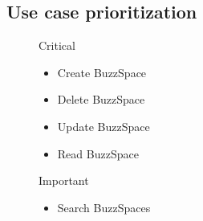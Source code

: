 \documentclass{article}
\begin{document}
	\subsection{Use case prioritization}
	\begin{description}
		\item[] Critical
		\begin{itemize}
			\item Create BuzzSpace
			\item Delete BuzzSpace
			\item Update BuzzSpace
			\item Read BuzzSpace
		\end{itemize}
		
		\item[] Important
		\begin{itemize}
			\item Search BuzzSpaces
		\end{itemize}
	\end{description}
	
\end{document}
